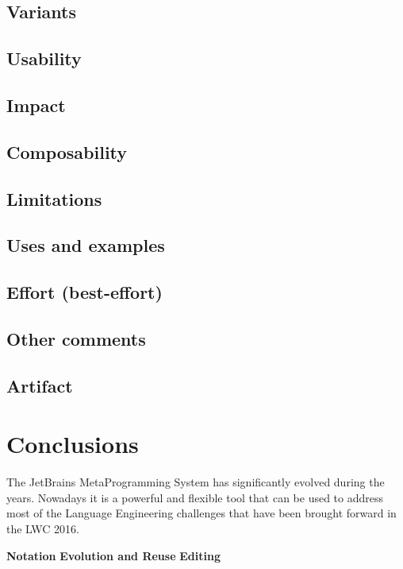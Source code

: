 \documentclass[preprint,numbers,10pt]{sigplanconf}
\begin{document}
\subsection{Variants}

\subsection{Usability}

\subsection{Impact}

\subsection{Composability}

\subsection{Limitations}

\subsection{Uses and examples}

\subsection{Effort (best-effort)}

\subsection{Other comments}

\subsection{Artifact}

%
%

\section{Conclusions}

The JetBrains MetaProgramming System has significantly evolved during the years. Nowadays it is a powerful and flexible tool that can be used to address most of the Language Engineering challenges that have been brought forward in the LWC 2016.

\textbf{Notation}
\textbf{Evolution and Reuse}
\textbf{Editing}



\end{document}
